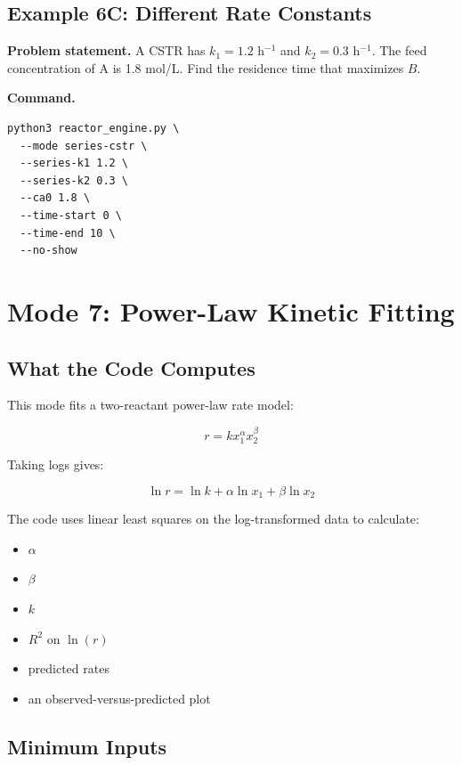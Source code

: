 \documentclass[11pt]{article}
\begin{document}
\subsection{Example 6C: Different Rate Constants}

\textbf{Problem statement.} A CSTR has $k_1=1.2$ h$^{-1}$ and $k_2=0.3$ h$^{-1}$. The feed concentration of A is 1.8 mol/L. Find the residence time that maximizes $B$.

\textbf{Command.}

\begin{lstlisting}
python3 reactor_engine.py \
  --mode series-cstr \
  --series-k1 1.2 \
  --series-k2 0.3 \
  --ca0 1.8 \
  --time-start 0 \
  --time-end 10 \
  --no-show
\end{lstlisting}

\section{Mode 7: Power-Law Kinetic Fitting}

\subsection{What the Code Computes}

This mode fits a two-reactant power-law rate model:

\begin{equation}
r = kx_1^\alpha x_2^\beta
\end{equation}

Taking logs gives:

\begin{equation}
\ln r = \ln k + \alpha \ln x_1 + \beta \ln x_2
\end{equation}

The code uses linear least squares on the log-transformed data to calculate:

\begin{itemize}
    \item $\alpha$
    \item $\beta$
    \item $k$
    \item $R^2$ on $\ln(r)$
    \item predicted rates
    \item an observed-versus-predicted plot
\end{itemize}

\subsection{Minimum Inputs}
\end{document}
